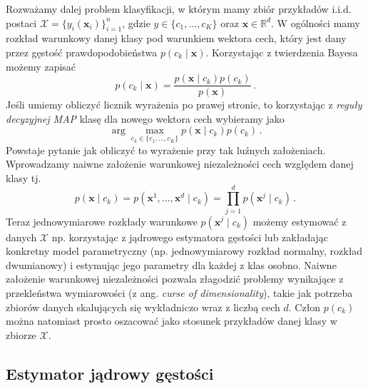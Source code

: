 \documentclass{myclass}
\numberwithin{equation}{subsection}
\begin{document}
Rozważamy dalej problem klasyfikacji, w którym mamy zbiór przykładów i.i.d. postaci \(\mathcal{X} =
\{y_i(\bm{x}_i)\}_{i=1}^n\), gdzie \(y \in \{c_1, \ldots, c_K\} \) oraz \(\bm{x} \in \mathbb{R}^d\).
W ogólności mamy rozkład warunkowy danej klasy pod warunkiem wektora cech, który jest dany przez
gęstość prawdopodobieństwa \(p(c_k \mid \bm{x})\). Korzystając z twierdzenia Bayesa możemy zapisać
\begin{equation}
    p(c_k \mid \bm{x}) = \frac{p(\bm{x} \mid c_k) p(c_k)}{p(\bm{x})}\,.
\end{equation}
Jeśli umiemy obliczyć licznik wyrażenia po prawej stronie, to korzystając z \emph{reguły decyzyjnej
MAP} klasę dla nowego wektora cech wybieramy jako
\begin{equation}
    \arg\max_{c_k \in \{c_1, \ldots, c_K\}} p(\bm{x} \mid c_k) p(c_k)\,.
\end{equation}
Powstaje pytanie jak obliczyć to wyrażenie przy tak luźnych założeniach. Wprowadzamy naiwne
założenie warunkowej niezależności cech względem danej klasy tj.
\begin{equation}
    p(\bm{x} \mid c_k) = p(\bm{x}^1, \ldots, \bm{x}^d \mid c_k) = \prod_{j=1}^d p(\bm{x}^j \mid c_k)\,.
\end{equation}
Teraz jednowymiarowe rozkłady warunkowe \(p(\bm{x}^j \mid c_k)\) możemy estymować z danych
\(\mathcal{X}\) np. korzystając z jądrowego estymatora gęstości lub zakładając konkretny model
parametryczny (np. jednowymiarowy rozkład normalny, rozkład dwumianowy) i estymując jego parametry
dla każdej z klas osobno. Naiwne założenie warunkowej niezależności pozwala złagodzić problemy
wynikające z przekleństwa wymiarowości (z ang. \textit{curse of dimensionality}), takie jak potrzeba
zbiorów danych skalujących się wykładniczo wraz z liczbą cech \(d\). Człon \(p(c_k)\) można
natomiast prosto oszacować jako stosunek przykładów danej klasy w zbiorze \(\mathcal{X}\).


\subsection{Estymator jądrowy gęstości}
\end{document}

